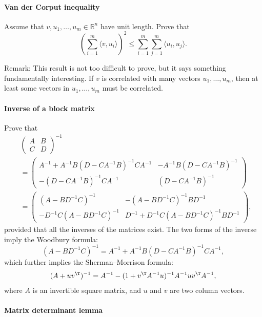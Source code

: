 \paragraph{Van der Corput inequality}
\label{hwmath1::vandercorputineq}

Assume that $v, u_1, \ldots, u_m \in \mathbb{R}^n$ have unit length. Prove  that 
$$
\left(  \sum_{i=1}^m   \langle v, u_i \rangle    \right)^2 \leq \sum_{i=1}^m \sum_{j=1}^m \langle u_i, u_j \rangle. 
$$


Remark: This result is not too difficult to prove, but it says something fundamentally interesting. If $v$ is correlated with many vectors $u_1, \ldots, u_m$, then at least some vectors in  $u_1, \ldots, u_m$ must be correlated. 



\paragraph{Inverse of a block matrix}\label{hwmath1::inverse-block-matrix}

Prove that 
\begin{align*}
&\left(\begin{array}{cc}
A & B\\
C & D
\end{array}\right)^{-1} \\
& =\left(\begin{array}{cc}
A^{-1}+A^{-1}B(D-CA^{-1}B)^{-1}CA^{-1} & -A^{-1}B(D-CA^{-1}B)^{-1}\\
-(D-CA^{-1}B)^{-1}CA^{-1} & (D-CA^{-1}B)^{-1}
\end{array}\right)\\
 & =\left(\begin{array}{cc}
(A-BD^{-1}C)^{-1} & -(A-BD^{-1}C)^{-1}BD^{-1}\\
-D^{-1}C (A-BD^{-1}C)^{-1} & D^{-1}+D^{-1}C(A-BD^{-1}C)^{-1}BD^{-1}
\end{array}\right),
\end{align*}
provided that all the inverses of the matrices exist. The two forms of the inverse imply the Woodbury formula:
\[
(A-BD^{-1}C)^{-1}=A^{-1}+A^{-1}B(D-CA^{-1}B)^{-1}CA^{-1},
\]
which further implies the Sherman--Morrison formula:
\[
(A+uv^{\T})^{-1}=A^{-1}-(1+v^{\T}A^{-1}u)^{-1}A^{-1}uv^{\T}A^{-1},
\]
where $A$ is an invertible square matrix,  and $u$ and $v$ are two column vectors. 



\paragraph{Matrix determinant lemma}\label{hwmath1::matrix-determinat-matrix}

